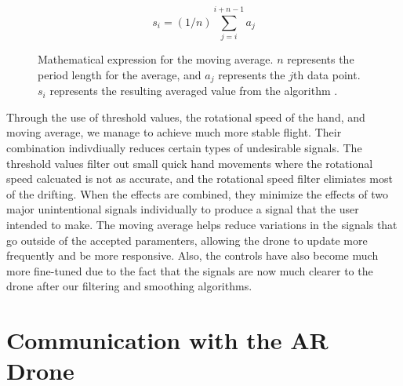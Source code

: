 \documentclass[letterpaper,english, 12pt]{article}
\begin{document}
\begin{figure}[t]
\[
	s_{i} = (1/n) \sum\limits_{j=i}^{i+n-1} a_{j}
\]
\caption{Mathematical expression for the moving average. $n$ represents the period length for the average, and $a_{j}$ represents the $j$th data point. $s_{i}$ represents the resulting averaged value from the algorithm \cite{cit14}.}
\end{figure}

Through the use of threshold values, the rotational speed of the hand, and moving average, we manage to achieve much more stable flight. Their combination indivdiually reduces certain types of undesirable signals. The threshold values filter out small quick hand movements where the rotational speed calcuated is not as accurate, and the rotational speed filter elimiates most of the drifting. When the effects are combined, they minimize the effects of two major unintentional signals individually to produce a signal that the user intended to make. The moving average helps reduce variations in the signals that go outside of the accepted paramenters, allowing the drone to update more frequently and be more responsive. Also, the controls have also become much more fine-tuned due to the fact that the signals are now much clearer to the drone after our filtering and smoothing algorithms.  

\section*{Communication with the AR Drone}
\end{document}

